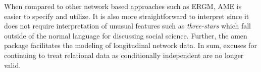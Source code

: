 \documentclass[12pt,pdflatex]{elsarticle}
\newcommand{\pkg}[1]{{\fontseries{b}\selectfont #1}}
\begin{document}
When compared to other network based approaches such as ERGM, AME is easier to specify and utilize. It is also more straightforward to interpret since it does not require interpretation of unusual features such as \textit{three-stars} which fall outside of the normal language for discussing social science. Further, the \pkg{amen} package facilitates the modeling of longitudinal network data. In sum, excuses for continuing to treat relational data as conditionally independent are no longer valid. 

\clearpage





\end{document}
